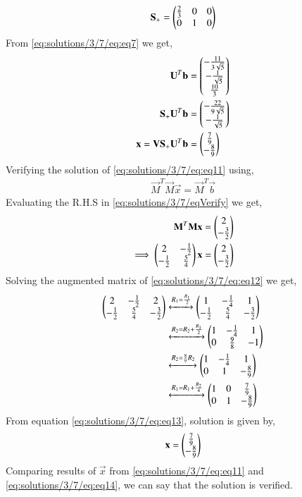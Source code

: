 \begin{align}
\mathbf{S_+} = \begin{pmatrix}\frac{2}{3}&0&0\\0&1&0\end{pmatrix}
\end{align}
From \eqref{eq:solutions/3/7/eq:eq7} we get,
\begin{align}
\mathbf{U}^T\mathbf{b}&=\begin{pmatrix}-\frac{11}{3\sqrt{5}}\\-\frac{1}{\sqrt{5}}\\\frac{10}{3}\end{pmatrix}\\
\mathbf{S_+}\mathbf{U}^T\mathbf{b}&=\begin{pmatrix}-\frac{22}{9\sqrt{5}}\\-\frac{1}{\sqrt{5}}\end{pmatrix}\\
\mathbf{x} = \mathbf{V}\mathbf{S_+}\mathbf{U}^T\mathbf{b} &= \begin{pmatrix}\frac{7}{9}\\-\frac{8}{9}\end{pmatrix} \label{eq:solutions/3/7/eq:eq11}
\end{align}
Verifying the solution of \eqref{eq:solutions/3/7/eq:eq11} using,
\begin{align}
\vec{M}^T\vec{M}\vec{x} = \vec{M}^T\vec{b}\label{eq:solutions/3/7/eqVerify}
\end{align}
Evaluating the R.H.S in \eqref{eq:solutions/3/7/eqVerify} we get,
\begin{align}
\mathbf{M}^T\mathbf{M}\mathbf{x} &= \begin{pmatrix}2\\-\frac{3}{2}\end{pmatrix}\\
\implies\begin{pmatrix}2&-\frac{1}{2}\\-\frac{1}{2}&\frac{5}{4}\end{pmatrix}\mathbf{x} &= \begin{pmatrix}2\\-\frac{3}{2}\end{pmatrix}\label{eq:solutions/3/7/eq:eq12}
\end{align}
Solving the augmented matrix of \eqref{eq:solutions/3/7/eq:eq12} we get,
\begin{align}
\begin{pmatrix}2&-\frac{1}{2}&2\\-\frac{1}{2}&\frac{5}{4}&-\frac{3}{2}\end{pmatrix} &\xleftrightarrow{R_1=\frac{R_1}{2}}\begin{pmatrix}1&-\frac{1}{4}&1\\-\frac{1}{2}&\frac{5}{4}&-\frac{3}{2}\end{pmatrix}\\
&\xleftrightarrow{R_2=R_2+\frac{R_1}{2}}\begin{pmatrix}1&-\frac{1}{4}&1\\0&\frac{9}{8}&-1\end{pmatrix}\\
&\xleftrightarrow{R_2=\frac{8}{9}R_2}\begin{pmatrix}1&-\frac{1}{4}&1\\0&1&-\frac{8}{9}\end{pmatrix}\\
&\xleftrightarrow{R_1=R_1+\frac{R_2}{4}}\begin{pmatrix}1&0&\frac{7}{9}\\0&1&-\frac{8}{9}\end{pmatrix}\label{eq:solutions/3/7/eq:eq13}
\end{align}
From equation \eqref{eq:solutions/3/7/eq:eq13}, solution is given by,
\begin{align}
\mathbf{x}=\begin{pmatrix}\frac{7}{9}\\-\frac{8}{9}\end{pmatrix}\label{eq:solutions/3/7/eq:eq14}
\end{align}
Comparing results of $\vec{x}$ from \eqref{eq:solutions/3/7/eq:eq11} and \eqref{eq:solutions/3/7/eq:eq14}, we can say that the solution is verified.
